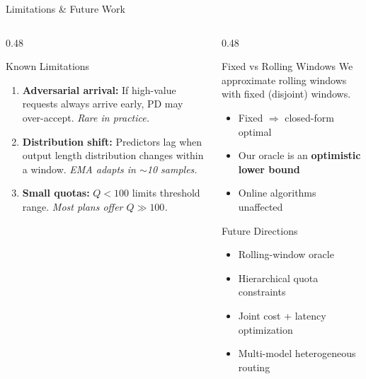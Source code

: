 \documentclass[aspectratio=169,10pt]{beamer}
\begin{document}
\begin{frame}{Limitations \& Future Work}
\begin{columns}[T]
\begin{column}{0.48\textwidth}
\begin{alertblock}{Known Limitations}
\small
\begin{enumerate}\setlength{\itemsep}{3pt}
    \item \textbf{Adversarial arrival:} If high-value requests always arrive early, PD may over-accept. \textit{Rare in practice.}
    \item \textbf{Distribution shift:} Predictors lag when output length distribution changes within a window. \textit{EMA adapts in $\sim$10 samples.}
    \item \textbf{Small quotas:} $Q < 100$ limits threshold range. \textit{Most plans offer $Q \gg 100$.}
\end{enumerate}
\end{alertblock}
\end{column}

\begin{column}{0.48\textwidth}
\begin{exampleblock}{Fixed vs Rolling Windows}
\small
We approximate rolling windows with fixed (disjoint) windows.
\begin{itemize}\setlength{\itemsep}{1pt}
    \item Fixed $\Rightarrow$ closed-form optimal
    \item Our oracle is an \textbf{optimistic lower bound}
    \item Online algorithms unaffected
\end{itemize}
\end{exampleblock}

\vspace{0.2cm}
\begin{block}{Future Directions}
\small
\begin{itemize}\setlength{\itemsep}{1pt}
    \item Rolling-window oracle
    \item Hierarchical quota constraints
    \item Joint cost + latency optimization
    \item Multi-model heterogeneous routing
\end{itemize}
\end{block}
\end{column}
\end{columns}
\end{frame}
\end{document}
